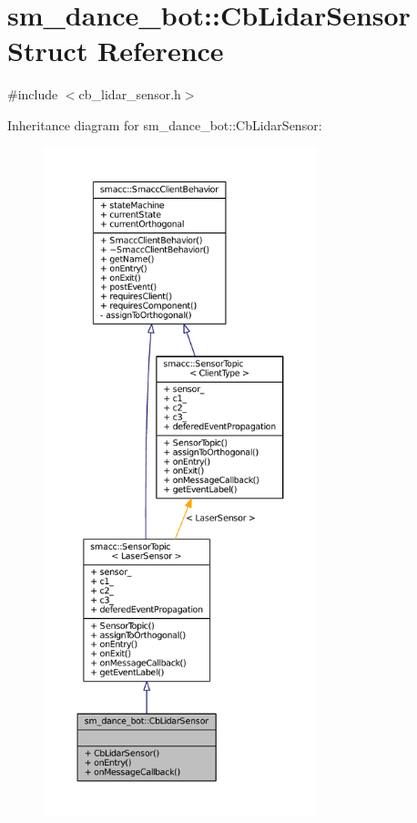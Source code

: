 \hypertarget{structsm__dance__bot_1_1CbLidarSensor}{}\section{sm\+\_\+dance\+\_\+bot\+:\+:Cb\+Lidar\+Sensor Struct Reference}
\label{structsm__dance__bot_1_1CbLidarSensor}


{\ttfamily \#include $<$cb\+\_\+lidar\+\_\+sensor.\+h$>$}



Inheritance diagram for sm\+\_\+dance\+\_\+bot\+:\+:Cb\+Lidar\+Sensor\+:
\nopagebreak
\begin{figure}[H]
\begin{center}
\leavevmode
\includegraphics[height=550pt]{structsm__dance__bot_1_1CbLidarSensor__inherit__graph}
\end{center}
\end{figure}


